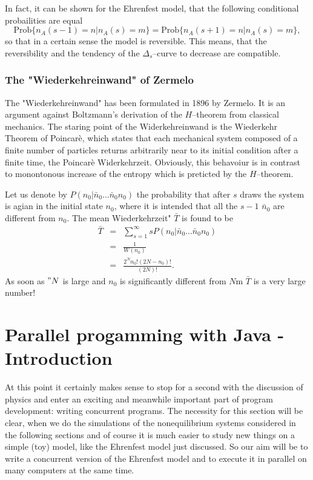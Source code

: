 In fact, it can be shown for the Ehrenfest model, that the following 
conditional probailities are equal
\begin{displaymath}
  \textrm{Prob} \{n_A(s-1)=n|n_A(s)=m \} = 
  \textrm{Prob} \{n_A(s+1)=n | n_A(s)=m \}, 
\end{displaymath}
so that in a certain sense  the model is reversible. This means, that the
reversibility and the tendency of the $\Delta_s$--curve to decrease are
compatible.

\subsubsection{The "Wiederkehreinwand" of Zermelo}
The "Wiederkehreinwand" has been formulated in 1896 by Zermelo. It is an
argument against Boltzmann's derivation  of the $H$--theorem from classical
mechanics. The staring point of the Widerkehreinwand is the Wiederkehr Theorem
of Poincar\`e, which states that each mechanical system composed of a finite
number of particles returns arbitrarily near to its initial condition after a
finite time, the Poincar\`e Widerkehrzeit. Obviously, this  behavoiur is in
contrast to monontonous increase of the entropy which is preticted by the
$H$--theorem. 

Let us denote by $P(n_0| \bar{n}_0 \ldots \bar{n}_0 n_0)$ the probability that
after $s$ draws the system is agian in the initial state $n_0$, where it is
intended that all the $s-1$ $\bar{n}_0$ are different from $n_0$. The mean
Wiederkehrzeit" $\bar{T}$ is found to be
\begin{eqnarray*}
  \bar{T} &=& \sum_{s=1}^{\infty} s P(n_0| \bar{n}_0 \ldots \bar{n}_0 n_0) \\
          & = & \frac{1}{W(n_0)} \\
          & = & \frac{2^N n_0! (2N-n_0)! }{(2N)!}.
\end{eqnarray*}
As soon as $"N$ is large and $n_0$ is significantly different from $N$m $\bar{T}$
is a very large number!


\section{Parallel progamming with Java - Introduction}
\label{sec:ParallelJava}

At this point it certainly makes sense to stop for a second with the 
discussion of physics and enter an exciting and meanwhile important 
part of program development: writing concurrent programs. The necessity
for this section will be clear, when we do the simulations of the 
nonequilibrium systems considered in the following sections and of 
course it is much easier to study new things on a simple (toy) model,
like the Ehrenfest model just discussed. So our aim will be to write
a concurrent version of the Ehrenfest model and to execute it in parallel
on many computers at the same time.

